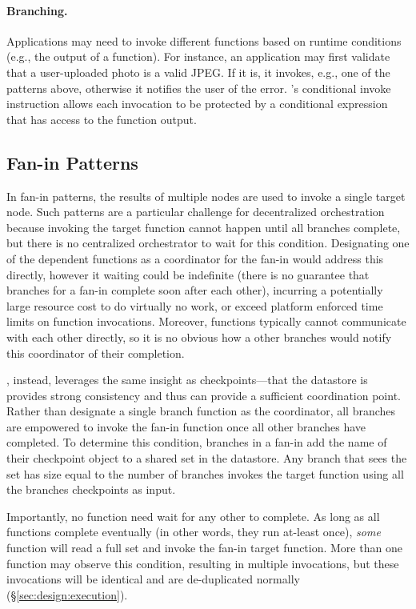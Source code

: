 \paragraph{Branching.}
Applications may need to invoke different functions based on runtime conditions
(e.g., the output of a function). For instance, an application may first
validate that a user-uploaded photo is a valid JPEG. If it is, it invokes, e.g.,
one of the patterns above, otherwise it notifies the user of the error.
\name{}'s conditional invoke instruction allows each invocation to be protected
by a conditional expression that has access to the function output.

\subsection{Fan-in Patterns}\label{sec:design:fanin}

In fan-in patterns, the results of multiple nodes are used to invoke a single
target node. Such patterns are a particular challenge for decentralized
orchestration because invoking the target function cannot happen until all
branches complete, but there is no centralized orchestrator to wait for this
condition. Designating one of the dependent functions as a coordinator for the
fan-in would address this directly, however it waiting could be indefinite
(there is no guarantee that branches for a fan-in complete soon after each
other), incurring a potentially large resource cost to do virtually no work, or
exceed platform enforced time limits on function invocations. Moreover,
functions typically cannot communicate with each other directly, so it is no
obvious how a other branches would notify this coordinator of their completion.

\name{}, instead, leverages the same insight as checkpoints---that the datastore
is provides strong consistency and thus can provide a sufficient coordination
point. Rather than designate a single branch function as the coordinator, all
branches are empowered to invoke the fan-in function once all other branches
have completed. To determine this condition, branches in a fan-in add the name
of their checkpoint object to a shared set in the datastore. Any branch that
sees the set has size equal to the number of branches invokes the target
function using all the branches checkpoints as input.

Importantly, no function need wait for any other to complete. As long as all
functions complete eventually (in other words, they run at-least once),
\emph{some} function will read a full set and invoke the fan-in target function.
More than one function may observe this condition, resulting in multiple
invocations, but these invocations will be identical and are de-duplicated
normally (\S\ref{sec:design:execution}).

